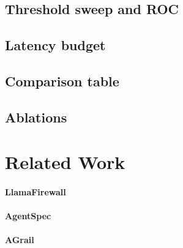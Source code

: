 \documentclass[11pt]{article}
\begin{document}
\subsection{Threshold sweep and ROC}

\subsection{Latency budget}

\subsection{Comparison table}

\subsection{Ablations}

\section{Related Work}
\label{sec:related}


\paragraph{LlamaFirewall} \cite{saxe2025llamafirewall}
\paragraph{AgentSpec} \cite{wang2025agentspec}
\paragraph{AGrail} \cite{luo2025agrail}
\end{document}
